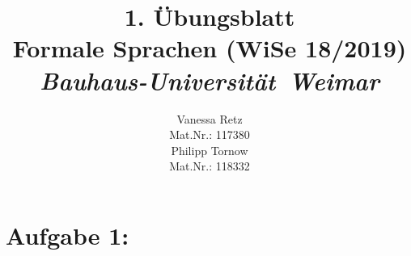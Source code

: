 \documentclass[11pt]{article}
\theoremstyle{definition}
\theoremstyle{remark}
\begin{document}
    \title{1. Übungsblatt\\
    Formale Sprachen (WiSe 18/2019)\\
    \textit{Bauhaus-Universität\ Weimar\\}
    }
    \author{Vanessa Retz\\
    \vspace{5mm}
    \normalsize Mat.Nr.: 117380\\
    \large Philipp Tornow\\
    \vspace {5mm}
    \normalsize Mat.Nr.: 118332\\
    }

    \maketitle

    \newpage
    \section*{Aufgabe 1:}
\end{document}
